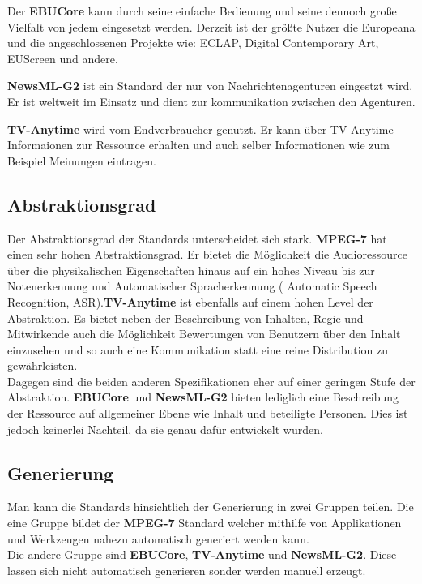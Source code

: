 	Der \textbf{EBUCore} kann durch seine einfache Bedienung und seine dennoch große Vielfalt von jedem eingesetzt werden. Derzeit ist der größte Nutzer die Europeana und die angeschlossenen Projekte wie: ECLAP, Digital Contemporary Art, EUScreen und andere.
	
	\textbf{NewsML-G2} ist ein Standard der nur von Nachrichtenagenturen eingestzt wird. Er ist weltweit im Einsatz und dient zur kommunikation zwischen den Agenturen.
	
	\textbf{TV-Anytime} wird vom Endverbraucher genutzt. Er kann über TV-Anytime Informaionen zur Ressource erhalten und auch selber Informationen wie zum Beispiel Meinungen eintragen.

	\subsection{Abstraktionsgrad}
Der Abstraktionsgrad der Standards unterscheidet sich stark. \textbf{MPEG-7} hat einen sehr hohen Abstraktionsgrad. Er bietet die Möglichkeit die Audioressource über die physikalischen Eigenschaften hinaus auf ein hohes Niveau bis zur Notenerkennung und Automatischer Spracherkennung ( Automatic Speech Recognition, ASR).\textbf{TV-Anytime} ist ebenfalls auf einem hohen Level der Abstraktion. Es bietet neben der Beschreibung von Inhalten, Regie und Mitwirkende auch die Möglichkeit Bewertungen von Benutzern über den Inhalt einzusehen und so auch eine Kommunikation statt eine reine Distribution zu gewährleisten.\\Dagegen sind die beiden anderen Spezifikationen eher auf einer geringen Stufe der Abstraktion. \textbf{EBUCore} und \textbf{NewsML-G2} bieten lediglich eine Beschreibung der Ressource auf allgemeiner Ebene wie Inhalt und beteiligte Personen. Dies ist jedoch keinerlei Nachteil, da sie genau dafür entwickelt wurden.\\

	\subsection{Generierung}
Man kann die Standards hinsichtlich der Generierung in zwei Gruppen teilen. Die eine Gruppe bildet der \textbf{MPEG-7} Standard welcher mithilfe von Applikationen und Werkzeugen nahezu automatisch generiert werden kann.\\Die andere Gruppe sind \textbf{EBUCore}, \textbf{TV-Anytime} und \textbf{NewsML-G2}. Diese lassen sich nicht automatisch generieren sonder werden manuell erzeugt.

